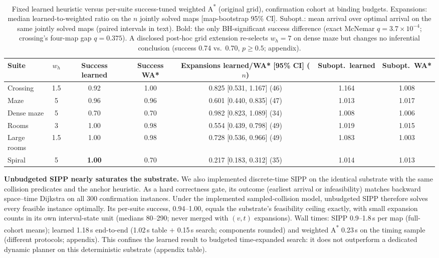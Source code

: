 \documentclass[letterpaper]{article} %
\begin{document}
\begin{table}[t]
\centering
\small
\begin{tabular}{lcccccc}
\toprule
Suite & $w_h$ & Success learned & Success WA* & Expansions learned/WA* [95\% CI] ($n$) & Subopt.\ learned & Subopt.\ WA* \\
\midrule
Crossing & 1.5 & 0.92 & 1.00 & 0.825 [0.531, 1.167] (46) & 1.164 & 1.008 \\
Maze & 5 & 0.96 & 0.96 & 0.601 [0.440, 0.835] (47) & 1.013 & 1.017 \\
Dense maze & 5 & 0.70 & 0.70 & 0.982 [0.823, 1.089] (34) & 1.008 & 1.006 \\
Rooms & 3 & 1.00 & 0.98 & 0.554 [0.439, 0.798] (49) & 1.019 & 1.015 \\
Large rooms & 1.5 & 1.00 & 0.98 & 0.728 [0.536, 0.966] (49) & 1.083 & 1.003 \\
Spiral & 5 & \textbf{1.00} & 0.70 & 0.217 [0.183, 0.312] (35) & 1.014 & 1.013 \\
\bottomrule
\end{tabular}
\caption{Fixed learned heuristic versus per-suite success-tuned weighted A\textsuperscript{*} (original grid), confirmation cohort at binding budgets. Expansions: median learned-to-weighted ratio on the $n$ jointly solved maps [map-bootstrap 95\% CI]. Subopt.: mean arrival over optimal arrival on the same jointly solved maps (paired intervals in text). Bold: the only BH-significant success difference (exact McNemar $q{=}3.7\times10^{-4}$; crossing's four-map gap $q{=}0.375$). A disclosed post-hoc grid extension re-selects $w_h{=}7$ on dense maze but changes no inferential conclusion (success 0.74 vs.\ 0.70, $p \geq 0.5$; appendix).}
\label{tab:wastar-main}
\end{table}

\textbf{Unbudgeted SIPP nearly saturates the substrate.} We also implemented discrete-time SIPP \citep{phillips2011sipp} on the identical substrate with the same collision predicates and the anchor heuristic. As a hard correctness gate, its outcome (earliest arrival or infeasibility) matches backward space--time Dijkstra on all 300 confirmation instances. Under the implemented sampled-collision model, unbudgeted SIPP therefore solves every feasible instance optimally. Its per-suite success, 0.94--1.00, equals the substrate's feasibility ceiling exactly, with small expansion counts in its own interval-state unit (medians 80--290; never merged with $(v,t)$ expansions). Wall times: SIPP 0.9--1.8\,s per map (full-cohort means); learned 1.18\,s end-to-end (1.02\,s table $+$ 0.15\,s search; components rounded) and weighted A\textsuperscript{*} 0.23\,s on the timing sample (different protocols; appendix). This confines the learned result to budgeted time-expanded search: it does not outperform a dedicated dynamic planner on this deterministic substrate (appendix table).
\end{document}
